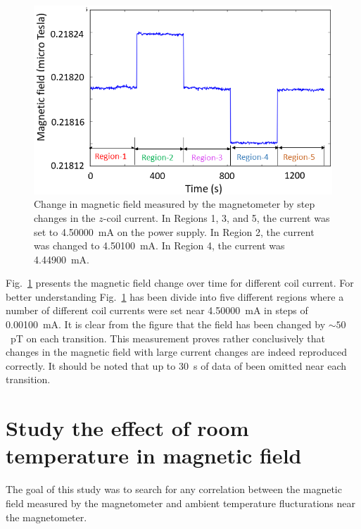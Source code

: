 \begin{figure}%
\centering
\includegraphics[width=0.7\linewidth]{figures/field_change-with-current}  
\caption{Change in magnetic field measured by the magnetometer by step
  changes in the $z$-coil current.  In Regions 1, 3, and 5, the
  current was set to 4.50000~mA on the power supply.  In Region 2, the
  current was changed to 4.50100~mA.  In Region 4, the current was
  4.44900~mA.\label{fig:field-change}}
\end{figure} 
 
Fig.~\ref{fig:field-change} presents the magnetic field change over
time for different coil current. For better understanding
Fig.~\ref{fig:field-change} has been divide into five different
regions where a number of different coil currents were set near
4.50000~mA in steps of 0.00100~mA.  It is clear from the figure that
the field has been changed by $\sim 50$~pT on each transition.  This
measurement proves rather conclusively that changes in the magnetic
field with large current changes are indeed reproduced correctly.  It
should be noted that up to 30~s of data of been omitted near each
transition.


\section{Study the effect of room temperature in magnetic field\label{sec:temperature}} 

The goal of this study was to search for any correlation between the
magnetic field measured by the magnetometer and ambient temperature
flucturations near the magnetometer.

